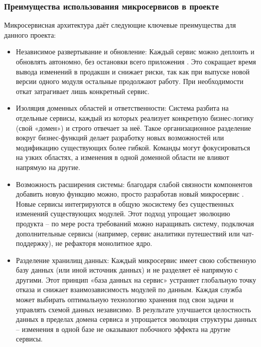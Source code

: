 \subsubsection*{Преимущества использования микросервисов в проекте}
Микросервисная архитектура даёт следующие ключевые преимущества для данного проекта:
\begin{itemize}
    \item Независимое развертывание и обновление: Каждый сервис можно деплоить и обновлять автономно, без остановки всего приложения \cite{5}. Это сокращает время вывода изменений в продакшн и снижает риски, так как при выпуске новой версии одного модуля остальные продолжают работу. При необходимости откат затрагивает лишь конкретный сервис.
    \item Изоляция доменных областей и ответственности: Система разбита на отдельные сервисы, каждый из которых реализует конкретную бизнес-логику (свой «домен») и строго отвечает за неё. Такое организационное разделение вокруг бизнес-функций делает разработку новых возможностей или модификацию существующих более гибкой. Команды могут фокусироваться на узких областях, а изменения в одной доменной области не влияют напрямую на другие.
    \item Возможность расширения системы: благодаря слабой связности компонентов добавить новую функцию можно, просто разработав новый микросервис \cite{2}. Новые сервисы интегрируются в общую экосистему без существенных изменений существующих модулей. Этот подход упрощает эволюцию продукта – по мере роста требований можно наращивать систему, подключая дополнительные сервисы (например, сервис аналитики путешествий или чат-поддержку), не рефакторя монолитное ядро.
    \item Разделение хранилищ данных: Каждый микросервис имеет свою собственную базу данных (или иной источник данных) и не разделяет её напрямую с другими. Этот принцип «база данных на сервис» устраняет глобальную точку отказа и снижает взаимозависимость модулей по данным. Каждая служба может выбирать оптимальную технологию хранения под свои задачи и управлять схемой данных независимо. В результате улучшается целостность данных в пределах домена сервиса и упрощается эволюция структуры данных – изменения в одной базе не оказывают побочного эффекта на другие сервисы.
\end{itemize}

